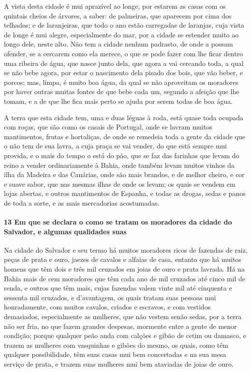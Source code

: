 \begin{linenumbers}
A vista desta cidade é mui aprazível ao longe, por estarem as casas com os quintais cheios
de árvores, a saber: de palmeiras, que aparecem por cima dos telhados; e de laranjeiras,
que todo o ano estão carregadas de laranjas, cuja vista de longe é mui alegre,
especialmente do mar, por a cidade se estender muito ao longo dele, neste alto. Não tem a
cidade nenhum padrasto, de onde a possam ofender, se a cercarem como ela merece, o que se
pode fazer com lhe ficar dentro uma ribeira de água, que nasce junto dela, que agora a vai
cercando toda, a qual se não bebe agora, por estar o nascimento dela pisado dos bois, que
vão beber, e porcos; mas, limpa, é muito boa água, da qual se não aproveitam os moradores
por haver outras muitas fontes de que bebe cada um, segundo a afeição que lhe tomam, e a
de que lhe fica mais perto se ajuda por serem todas de boa água.

A terra que esta cidade tem, uma e duas léguas à roda, está quase toda ocupada com roças,
que são como os casais de Portugal, onde se lavram muitos mantimentos, frutas e
hortaliças, de onde se remedeia toda a gente da cidade que o não tem de sua lavra, a cuja
praça se vai vender, do que está sempre mui provida, e o mais do tempo o está do pão, que
se faz das farinhas que levam do reino a vender ordinariamente à Bahia, onde também levam
muitos vinhos da ilha da Madeira e das Canárias, onde são mais brandos, e de melhor
cheiro, e cor e suave sabor, que nas mesmas ilhas de onde os levam; os quais se vendem em
lojas abertas, e outros mantimentos de Espanha, e todas as drogas, sedas e panos de toda a
sorte, e as mais mercadorias acostumadas.

\paragraph{13 Em que se declara o como se tratam os moradores da cidade do Salvador, e
algumas qualidades suas} \quad
Na cidade do Salvador e seu termo há muitos moradores ricos de fazendas de raiz, peças de
prata e ouro, jaezes de cavalos e alfaias de casa, entanto que há muitos homens que têm
dois e três mil cruzados em joias de ouro e prata lavrada. Há na Bahia mais de cem
moradores que têm cada ano de mil cruzados até cinco mil de renda, e outros que têm mais,
cujas fazendas valem vinte mil até cinquenta e sessenta mil cruzados, e d'avantagem, os
quais tratam suas pessoas mui honradamente, com muitos cavalos, criados e escravos, e com
vestidos demasiados, especialmente as mulheres, que não vestem senão sedas, por a terra
não ser fria, no que fazem grandes despesas, mormente entre a gente de menor condição;
porque qualquer peão anda com calções e gibão de cetim ou damasco, e trazem as mulheres
com vasquinhas e gibões do mesmo, os quais, como têm qualquer possibilidade, têm suas
casas mui bem concertadas e na sua mesa serviço de prata, e trazem suas mulheres mui bem
ataviadas de joias de ouro.


\end{linenumbers}
